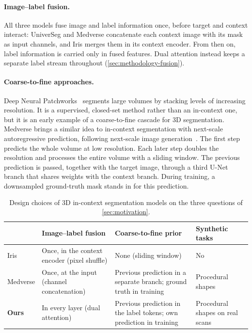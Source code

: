 \documentclass[hidelinks, a4paper, 12pt, ngerman, english]{article}  %
\begin{document}
\paragraph{Image--label fusion.}
All three models fuse image and label information once, before target and
context interact: UniverSeg and Medverse concatenate each context image with
its mask as input channels, and Iris merges them in its context encoder. From
then on, label information is carried only in fused features. Dual attention
instead keeps a separate label stream throughout
(\autoref{sec:methodology-fusion}).

\paragraph{Coarse-to-fine approaches.}
Deep Neural Patchworks~\cite{reisertDeepNeuralPatchworks2022a} segments large
volumes by stacking levels of increasing resolution. It is a supervised,
closed-set method rather than an in-context one, but it is an early example of
a coarse-to-fine cascade for 3D segmentation. Medverse brings a similar idea to
in-context segmentation with next-scale autoregressive prediction, following
next-scale image generation~\cite{tian2024visual}. The first step predicts the
whole volume at low resolution. Each later step doubles the resolution and
processes the entire volume with a sliding window. The previous prediction is
passed, together with the target image, through a third U-Net branch that
shares weights with the context branch. During training, a downsampled
ground-truth mask stands in for this prediction.

\begin{table}[t]
  \centering
  \small
  \caption{Design choices of 3D in-context segmentation models on the three
    questions of \autoref{sec:motivation}.}
  \label{tab:relatedwork}
  \begin{tabular}{@{} l p{4.2cm} p{4.4cm} p{3.4cm} @{}}
    \toprule
    & Image--label fusion & Coarse-to-fine prior & Synthetic tasks \\
    \midrule
    Iris & Once, in the context encoder (pixel shuffle) & None (sliding window) & No \\
    Medverse & Once, at the input (channel concatenation) & Previous prediction in a separate branch; ground truth in training & Procedural shapes \\
    \textbf{Ours} & In every layer (dual attention) & Previous prediction in the label tokens; own prediction in training & Procedural shapes on real scans \\
    \bottomrule
  \end{tabular}
\end{table}
\end{document}
